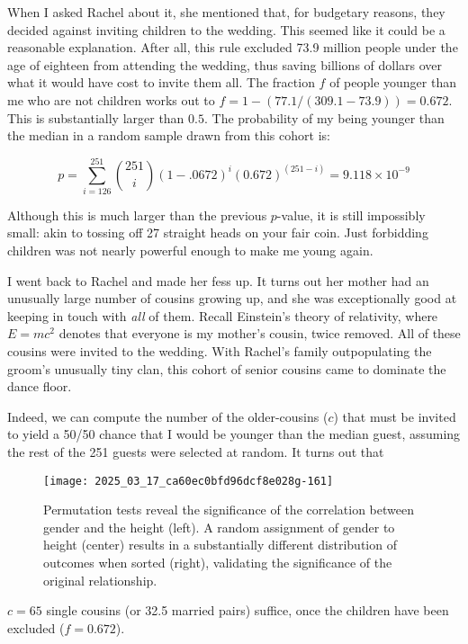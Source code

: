 \documentclass[10pt]{article}
\begin{document}
When I asked Rachel about it, she mentioned that, for budgetary reasons, they decided against inviting children to the wedding. This seemed like it could be a reasonable explanation. After all, this rule excluded 73.9 million people under the age of eighteen from attending the wedding, thus saving billions of dollars over what it would have cost to invite them all. The fraction $f$ of people younger than me who are not children works out to $f=1-(77.1/(309.1-73.9))=0.672$. This is substantially larger than $0.5$. The probability of my being younger than the median in a random sample drawn from this cohort is:

\[
p=\sum_{i=126}^{251}\binom{251}{i}(1-.0672)^{i}(0.672)^{(251-i)}=9.118 \times 10^{-9}
\]

Although this is much larger than the previous $p$-value, it is still impossibly small: akin to tossing off 27 straight heads on your fair coin. Just forbidding children was not nearly powerful enough to make me young again.

I went back to Rachel and made her fess up. It turns out her mother had an unusually large number of cousins growing up, and she was exceptionally good at keeping in touch with \textit{all} of them. Recall Einstein's theory of relativity, where $E=m c^{2}$ denotes that everyone is my mother's cousin, twice removed. All of these cousins were invited to the wedding. With Rachel's family outpopulating the groom's unusually tiny clan, this cohort of senior cousins came to dominate the dance floor.

Indeed, we can compute the number of the older-cousins ($c$) that must be invited to yield a 50/50 chance that I would be younger than the median guest, assuming the rest of the 251 guests were selected at random. It turns out that

\begin{figure}[ht]
    \centering
    \texttt{[image: 2025\_03\_17\_ca60ec0bfd96dcf8e028g-161]}
    \caption{Permutation tests reveal the significance of the correlation between gender and the height (left). A random assignment of gender to height (center) results in a substantially different distribution of outcomes when sorted (right), validating the significance of the original relationship.}
    \label{fig:permutation-tests}
\end{figure}

$c=65$ single cousins (or 32.5 married pairs) suffice, once the children have been excluded ($f=0.672$).
\end{document}
